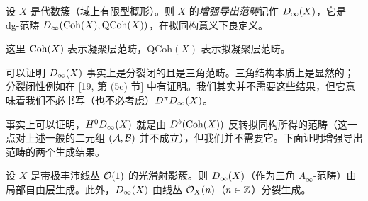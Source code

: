 
\begin{definition*}
设 $X$ 是代数簇（域上有限型概形）。则 $X$ 的\emph{增强导出范畴}记作 $D_\infty(X)$，它是 dg-范畴 $D_\infty(\operatorname{Coh}(X), \mathrm{QCoh}(X))$，在拟同构意义下良定义。
\end{definition*}


这里 $\operatorname{Coh}(X)$ 表示凝聚层范畴，$\mathrm{QCoh}(X)$ 表示拟凝聚层范畴。

可以证明 $D_\infty(X)$ 事实上是分裂闭的且是三角范畴。三角结构本质上是显然的；分裂闭性例如在 [19, 第 (5c) 节] 中有证明。我们其实并不需要这些结果，但它意味着我们不必书写（也不必考虑）$D^\pi D_\infty(X)$。


事实上可以证明，$H^0D_\infty(X)$ 就是由 $D^b(\operatorname{Coh}(X))$ 反转拟同构所得的范畴（这一点对上述一般的二元组 $(\mathcal{A},\mathcal{B})$ 并不成立），但我们并不需要它。下面证明增强导出范畴的两个生成结果。


\begin{theorem}\label{thm:3.2}
设 $X$ 是带极丰沛线丛 $\mathcal{O}(1)$ 的光滑射影簇。则 $D_\infty(X)$（作为三角 $A_\infty$-范畴）由局部自由层生成。此外，$D_\infty(X)$ 由线丛 $\mathcal{O}_X(n)$（$n\in\mathbb{Z}$）分裂生成。
\end{theorem}

